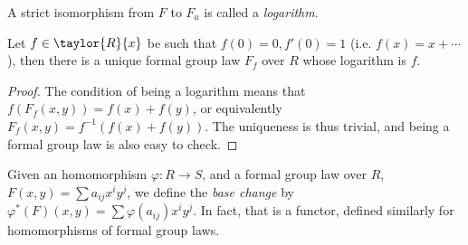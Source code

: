 \begin{definition*}
	A strict isomorphism from $F$ to $F_a$ is called a \emph{logarithm}.
\end{definition*}

\begin{claim*}
	Let $f \in \taylor{R}{x}$ be such that $f\left(0\right) = 0, f'\left(0\right) = 1$ (i.e. $f\left(x\right) = x + \cdots$),
	then there is a unique formal group law $F_f$ over $R$ whose logarithm is $f$.
\end{claim*}

\begin{proof}
	The condition of being a logarithm means that $f\left(F_f\left(x,y\right)\right) = f\left(x\right) + f\left(y\right)$, or equivalently $F_f\left(x,y\right) = f^{-1}\left(f\left(x\right) + f\left(y\right)\right)$.
	The uniqueness is thus trivial, and being a formal group law is also easy to check.
\end{proof}

\begin{definition*}
	Given an homomorphism $\varphi: R \to S$,
	and a formal group law over $R$, $F\left(x,y\right) = \sum a_{ij} x^i y^j$,
	we define the \emph{base change} by
	$
	\varphi^*\left(F\right)\left(x,y\right)
	=
	\sum \varphi\left(a_{ij}\right) x^i y^j
	$.
	In fact, that is a functor, defined similarly for homomorphisms of formal group laws.
\end{definition*}
